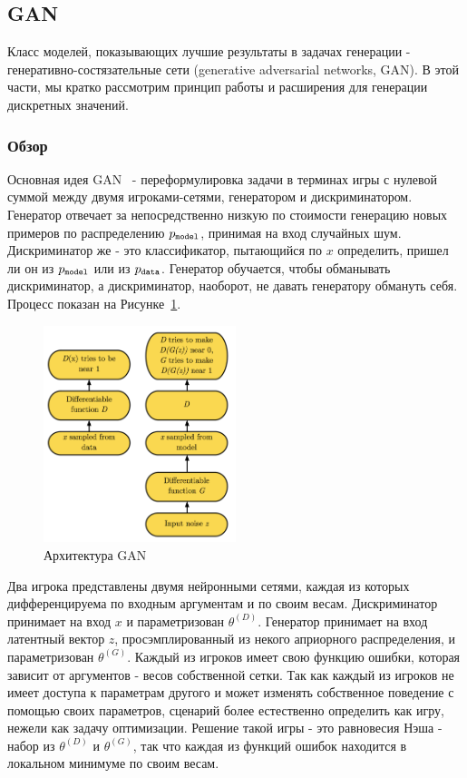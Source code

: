 \documentclass{spbau-diploma}
\begin{document}
\subsection{GAN}
Класс моделей, показывающих лучшие результаты в задачах генерации - 
генеративно-состязательные сети (generative adversarial networks, GAN). В этой 
части, мы кратко рассмотрим принцип работы и расширения для генерации дискретных 
значений.

\subsubsection{Обзор}
Основная идея GAN~\cite{1406.2661} - переформулировка задачи в терминах 
игры с нулевой суммой между двумя игроками-сетями, генератором и 
дискриминатором. Генератор отвечает за непосредственно низкую по стоимости 
генерацию новых примеров по распределению $p_{\texttt{model}}$, принимая на вход случайных 
шум. Дискриминатор же - это классификатор, пытающийся по $x$ определить,
пришел ли он из $p_{\texttt{model}}$ или из $p_{\texttt{data}}$. Генератор обучается, чтобы обманывать 
дискриминатор, а дискриминатор, наоборот, не давать генератору обмануть себя. 
Процесс показан на Рисунке~\ref{gan_fw}.

\begin{figure}[H]
\centering
\includegraphics[width=0.5\textwidth]{images/gan_fw.png}
\caption{Архитектура GAN~\cite{1701.00160}}
\label{gan_fw}
\end{figure}

Два игрока представлены двумя нейронными сетями, каждая из которых 
дифференцируема по входным аргументам и по своим весам. Дискриминатор принимает
на вход $x$ и параметризован $\theta^{(D)}$. Генератор принимает на вход 
латентный вектор $z$, просэмплированный из некого априорного
распределения, и параметризован $\theta^{(G)}$. Каждый из игроков имеет свою
функцию ошибки, которая зависит от аргументов - весов собственной сетки. Так как
каждый из игроков не имеет доступа к параметрам другого и может изменять 
собственное поведение с помощью своих параметров, сценарий более 
естественно определить как игру, нежели как задачу оптимизации. Решение такой
игры - это равновесия Нэша - набор из $\theta^{(D)}$ и $\theta^{(G)}$, так что
каждая из функций ошибок находится в локальном минимуме по своим весам.
\end{document}
